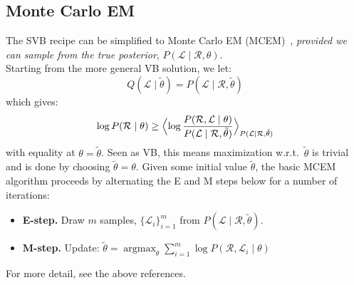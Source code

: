 \documentclass[a4paper,oneside,12pt,english]{report}
\DeclareMathOperator*{\argmax}{argmax}
\def\Expv#1#2{\Bigl\langle#1\Bigr\rangle_{#2}}
\def\Lset{\mathcal{L}}
\def\Rset{\mathcal{R}}
\begin{document}
\subsection{Monte Carlo EM}
The SVB recipe can be simplified to Monte Carlo EM (MCEM)~\cite{mcem_wei,mcem_levine,mcem_neath}, \emph{provided we can sample from the true posterior}, $P(\Lset\mid\Rset,\theta)$. \\

\noindent Starting from the more general VB solution, we let:
$$Q(\Lset\mid\tilde\theta)=P(\Lset\mid\Rset,\tilde\theta)$$
which gives:
\begin{align}
\log P(\Rset\mid\theta) \ge \Expv{\log\frac{P(\Rset,\Lset\mid\theta)}{P(\Lset\mid\Rset,\tilde\theta)}}{P(\Lset\mid\Rset,\tilde\theta)}
\end{align}
with equality at $\theta=\tilde\theta$. Seen as VB, this means maximization w.r.t.\ $\tilde\theta$ is trivial and is done by choosing $\tilde\theta=\theta$. Given some initial value $\tilde\theta$, the basic MCEM algorithm proceeds by alternating the E and M steps below for a number of iterations: 
\begin{itemize}
	\item[]\textbf{E-step.} Draw $m$ samples, $\{\Lset_i\}_{i=1}^m$ from $P(\Lset\mid\Rset,\tilde\theta)$.
	\item[]\textbf{M-step.} Update: $\tilde\theta = \argmax_\theta \sum_{i=1}^m \log P(\Rset,\Lset_i\mid\theta)$
\end{itemize}
For more detail, see the above references.
\end{document}

